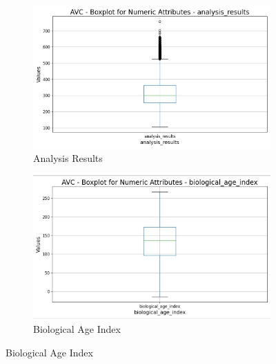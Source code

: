 \documentclass[a4paper,12pt]{article}
\begin{document}
\begin{figure}[h!]
    \centering
    \begin{subfigure}[b]{0.45\textwidth}
        \centering
        \includegraphics[width=\textwidth]{Resources/Boxplot_analysis_results.jpeg}
        \caption{Analysis Results}
        \label{fig:analysis_results}
    \end{subfigure}
    \hfill
    \begin{subfigure}[b]{0.45\textwidth}
        \centering
        \includegraphics[width=\textwidth]{Resources/Boxplot_biological_index.jpeg}
        \caption{Biological Age Index}
        \label{fig:biological_index}
    \end{subfigure}
    
    \vspace{0.5cm}
    

\end{figure}
\end{document}
